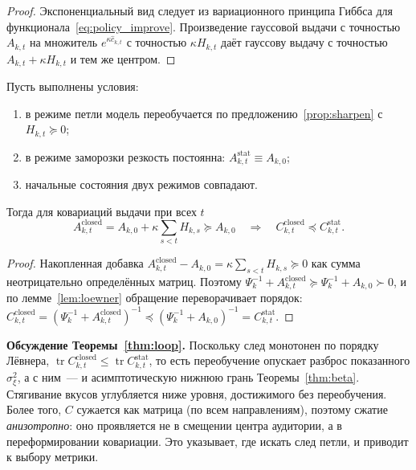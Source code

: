 \begin{proof}
Экспоненциальный вид следует из вариационного принципа
Гиббса для функционала~\eqref{eq:policy_improve}. Произведение гауссовой выдачи
с точностью $A_{k,t}$ на множитель $e^{\kappa\widehat c_{k,t}}$ с точностью
$\kappa H_{k,t}$ даёт гауссову выдачу с точностью $A_{k,t}+\kappa H_{k,t}$ и тем
же центром.
\end{proof}

\begin{theorem}
\label{thm:loop}
Пусть выполнены условия:
\begin{enumerate}[label=\textup{(\arabic*)}, leftmargin=2em]
    \item в режиме петли модель переобучается по
    предложению~\textup{\ref{prop:sharpen}} с $H_{k,t}\succeq0$;
    \item в режиме заморозки резкость постоянна:
    $A_{k,t}^{\mathrm{stat}}\equiv A_{k,0}$;
    \item начальные состояния двух режимов совпадают.
\end{enumerate}
Тогда для ковариаций выдачи при всех $t$
\[
    A_{k,t}^{\mathrm{closed}}=A_{k,0}+\kappa\sum_{s<t}H_{k,s}\succeq A_{k,0}
    \quad\Longrightarrow\quad
    C_{k,t}^{\mathrm{closed}}\preceq C_{k,t}^{\mathrm{stat}}.
\]
\end{theorem}

\begin{proof}
Накопленная добавка
$A_{k,t}^{\mathrm{closed}}-A_{k,0}=\kappa\sum_{s<t}H_{k,s}\succeq0$ как сумма
неотрицательно определённых матриц. Поэтому
$\Psi_k^{-1}+A_{k,t}^{\mathrm{closed}}\succeq\Psi_k^{-1}+A_{k,0}\succ0$, и по
лемме~\ref{lem:loewner} обращение переворачивает порядок:
$C_{k,t}^{\mathrm{closed}}=(\Psi_k^{-1}+A_{k,t}^{\mathrm{closed}})^{-1}
\preceq(\Psi_k^{-1}+A_{k,0})^{-1}=C_{k,t}^{\mathrm{stat}}$.
\end{proof}

\textbf{Обсуждение Теоремы~\ref{thm:loop}.} Поскольку след монотонен по порядку
Лёвнера, $\operatorname{tr}C_{k,t}^{\mathrm{closed}}\le\operatorname{tr}
C_{k,t}^{\mathrm{stat}}$, то есть переобучение опускает разброс показанного
$\sigma_\xi^2$, а с ним~--- и асимптотическую нижнюю грань
Теоремы~\ref{thm:beta}. Стягивание вкусов углубляется ниже уровня, достижимого
без переобучения. Более того, $C$ сужается как матрица (по всем направлениям),
поэтому сжатие \emph{анизотропно}: оно проявляется не в смещении центра
аудитории, а в переформировании ковариации. Это указывает, где искать след
петли, и приводит к выбору метрики.

